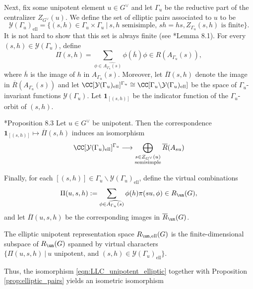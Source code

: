 Next, fix some unipotent element $u\in G^\vee$ and let $\Gamma_u$ be the reductive part of the centralizer $Z_{G^\vee}(u)$. We define the set of elliptic pairs associated to $u$ to be
$$\mathcal{Y}(\Gamma_u)_{\mathrm{ell}}=\{(s,h)\in\Gamma_u\times\Gamma_u\ |\ s,h\text{ semisimple, }sh=hs, Z_{\Gamma_u}(s,h)\text{ is finite}\}.$$
It is not hard to show that this set is always finite (see \cite{AubertCiubotaruRomano2024}*{Lemma 8.1}). For every $(s,h)\in\mathcal{Y}(\Gamma_u)$, define 
\begin{equation}\label{eqn:virtual_ellipticpair}
    \Pi(s,h)=\sum_{\phi\in\widehat{A_{\Gamma_u}(s)}}\phi(\overline{h})\phi\in R(A_{\Gamma_u}(s)),
\end{equation}
where $\overline{h}$ is the image of $h$ in $A_{\Gamma_u}(s)$. Moreover, let $\overline{\Pi}(s,h)$ denote the image in $\overline{R}(A_{\Gamma_u}(s))$ and let $\CC[\mathcal{Y}(\Gamma_u)_{\mathrm{ell}}]^{\Gamma_u}\cong\CC[\Gamma_u\backslash\mathcal{Y}(\Gamma_u)_{\mathrm{ell}}]$ be the space of $\Gamma_u$-invariant functions $\mathcal{Y}(\Gamma_u)$. Let $\mathbf{1}_{[(s,h)]}$ be the indicator function of the $\Gamma_u$-orbit of $(s,h)$. 
\begin{proposition}\label{prop:elliptic_pairs}\cite{AubertCiubotaruRomano2024}*{Proposition 8.3} Let $u\in G^\vee$ be unipotent. Then the correspondence $\mathbf{1}_{[(s,h)]}\mapsto\overline{\Pi}(s,h)$ induces an isomorphism
    $$\CC[\mathcal{Y}(\Gamma_u)_{\mathrm{ell}}]^{\Gamma_u}\longrightarrow\bigoplus_{\substack{s\in Z_{G^\vee}(u)\\\mathrm{semisimple}}}\overline{R}(A_{su})$$
\end{proposition}
Finally, for each $[(s,h)]\in\Gamma_u\backslash\mathcal{Y}(\Gamma_u)_{\mathrm{ell}}$, define the virtual combinations
\begin{equation}
    \Pi(u,s,h):=\sum_{\phi\in\widehat{A_{\Gamma_u}(s)}}\phi(h)\pi(su,\phi)\in R_{\un}(G),
\end{equation}
and let $\overline{\Pi}(u,s,h)$ be the corresponding images in $\overline{R}_{\un}(G)$.
\begin{definition}
    The elliptic unipotent representation space $R_{\un,\mathrm{ell}}(G)$ is the finite-dimensional subspace of $R_{\un}(G)$ spanned by virtual characters 
    $\{\Pi(u,s,h)\ |\ u\text{ unipotent, and }(s,h)\in\mathcal{Y}(\Gamma_u)_{\mathrm{ell}}\}.$
\end{definition}
Thus, the isomorphism \eqref{eqn:LLC_unipotent_elliptic} together with Proposition \ref{prop:elliptic_pairs} yields an isometric isomorphism
